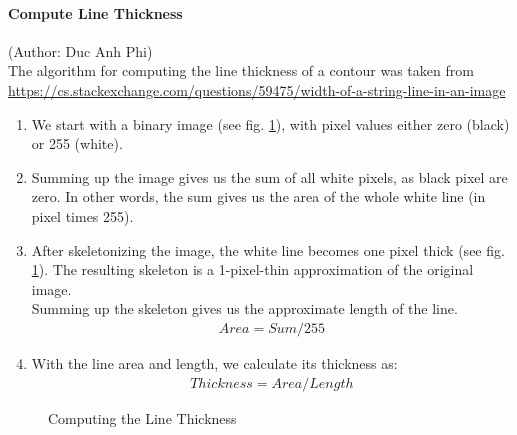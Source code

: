 \documentclass[12pt]{article}
\begin{document}
	\paragraph{Compute Line Thickness}
	\small{(Author: Duc Anh Phi)}\\
	The algorithm for computing the line thickness of a contour was taken from \url{https://cs.stackexchange.com/questions/59475/width-of-a-string-line-in-an-image}
	\begin{enumerate}
		\item We start with a binary image (see fig. \ref{fig:linethickness}), with pixel values either zero (black) or 255 (white).
		\item Summing up the image gives us the sum of all white pixels, as black pixel are zero. In other words, the sum gives us the area of the whole white line (in pixel times 255).
		\item After skeletonizing the image, the white line becomes one pixel thick (see fig. \ref{fig:linethickness}). The resulting skeleton is a 1-pixel-thin approximation of the original image.\\
		Summing up the skeleton gives us the approximate length of the line.
		\begin{align}
		Area = Sum/255
		\end{align}
		\item With the line area and length, we calculate its thickness as:
		\begin{align}
		Thickness = Area / Length
		\end{align}
	\end{enumerate}

	\begin{figure}[h!]
		\centering
		\quad
		
		\caption{Computing the Line Thickness}
		\label{fig:linethickness}
	\end{figure}
	
\end{document}
